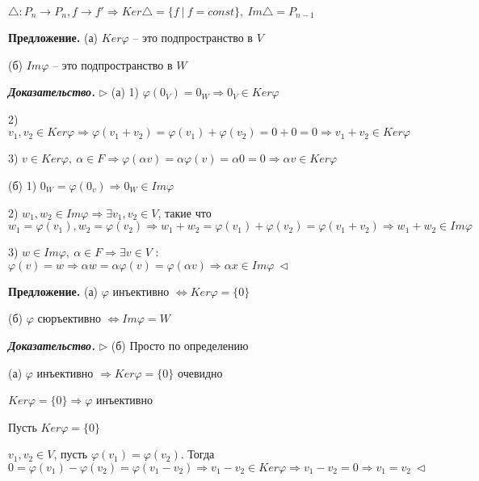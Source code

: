 $\triangle : P_n \rightarrow P_n, f \rightarrow f' \Rightarrow Ker \triangle = \{f \ | \ f = const \}, \ Im \triangle = P_{n-1}$

\vspace{\baselineskip}
\textbf{Предложение.} (а) $Ker \varphi$ -- это подпространство в $V$

(б) $Im \varphi$ -- это подпространство в $W$

\vspace{\baselineskip}
\textbf{\textit{Доказательство.}} $\rhd$ (а) 1) $\varphi (0_V) = 0_W \Rightarrow 0_V \in Ker \varphi$

2) $v_1, v_2 \in Ker \varphi \Rightarrow \varphi (v_1 + v_2) = \varphi(v_1) + \varphi(v_2) = 0 + 0 = 0 \Rightarrow v_1 + v_2 \in Ker \varphi$

3) $v \in Ker \varphi, \ \alpha \in F \Rightarrow \varphi (\alpha v) = \alpha \varphi (v) = \alpha 0 = 0 \Rightarrow \alpha v \in Ker \varphi$

\vspace{\baselineskip}
(б) 1) $0_W = \varphi (0_v) \Rightarrow 0_W \in Im \varphi$

2) $w_1, w_2 \in Im \varphi \Rightarrow \exists v_1, v_2 \in V$, такие что $w_1 = \varphi (v_1), w_2 = \varphi(v_2) \Rightarrow w_1 + w_2 = \varphi (v_1) + \varphi (v_2) = \varphi (v_1 + v_2) \Rightarrow w_1 + w_2 \in Im \varphi$

3) $w \in Im \varphi, \ \alpha \in F \Rightarrow \exists v \in V$ : $\varphi (v) = w \Rightarrow \alpha w = \alpha \varphi (v) = \varphi (\alpha v) \Rightarrow \alpha x \in Im \varphi \ \lhd$

\vspace{\baselineskip}
\textbf{Предложение.} (а) $\varphi$ инъективно $\Leftrightarrow Ker \varphi = \{0\}$

(б) $\varphi$ сюръективно $\Leftrightarrow Im \varphi = W$

\vspace{\baselineskip}
\textbf{\textit{Доказательство.}} $\rhd$ (б) Просто по определению

(а) $\varphi$ инъективно $\Rightarrow Ker \varphi = \{0\}$ очевидно

$Ker \varphi = \{0\} \Rightarrow \varphi$ инъективно

Пусть $Ker \varphi = \{0\}$

$v_1, v_2 \in V$, пусть $\varphi (v_1) = \varphi(v_2)$. Тогда $0 = \varphi(v_1) - \varphi(v_2) = \varphi(v_1 - v_2) \Rightarrow v_1 - v_2 \in Ker \varphi \Rightarrow v_1 - v_2 = 0 \Rightarrow v_1 = v_2 \ \lhd$

